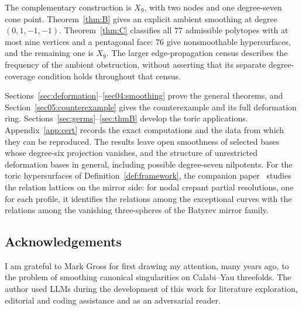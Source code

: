 The complementary construction is $X_9$, with two nodes and one
degree-seven cone point.  Theorem~\ref{thm:B} gives an explicit ambient
smoothing at degree $(0,1,-1,-1)$.  Theorem~\ref{thm:C} classifies all
$77$ admissible polytopes with at most nine vertices and a pentagonal
face: $76$ give nonsmoothable hypersurfaces, and the remaining one is
$X_9$.  The larger edge-propagation census describes the frequency of
the ambient obstruction, without asserting that its separate
degree-coverage condition holds throughout that census.

Sections~\ref{sec:deformation}--\ref{sec04:smoothing} prove the general
theorems, and Section~\ref{sec05:counterexample} gives the counterexample
and its full deformation ring.  Sections~\ref{sec:germs}--\ref{sec:thmB}
develop the toric applications.  Appendix~\ref{app:cert} records the
exact computations and the data from which they can be reproduced.
The results leave open smoothness of selected bases whose degree-six
projection vanishes, and the structure of unrestricted deformation
bases in general, including possible degree-seven nilpotents.
For the toric hypersurfaces of Definition~\ref{def:framework}, the companion
paper~\cite{PaperVI} studies the relation lattices on the mirror side: for
nodal crepant partial resolutions, one for each profile, it identifies the
relations among the exceptional curves with the relations among the vanishing
three-spheres of the Batyrev mirror family.

\subsection*{Acknowledgements}
I am grateful to Mark Gross for first drawing my attention, many years ago, to the problem of smoothing canonical singularities on Calabi--Yau threefolds.
The author used LLMs during the development of this work for literature exploration, editorial and coding assistance and as an adversarial reader.
